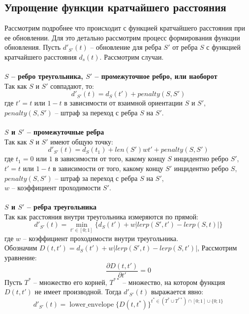 \subsection{Упрощение функции кратчайшего расстояния}
Рассмотрим подробнее что происходит с функцией кратчайшего расстояния
при ее обновлении. Для это детально рассмотрим процесс формирования
функции обновления. Пусть $d'_{S'}(t)$ -- обновление для ребра $S'$ от ребра
$S$ с функцией кратчайшего расстояния $d_s(t)$. Рассмотрим случаи.
\\
\\
\textbf{$S$ -- ребро треугольника, $S'$ -- промежуточное ребро, или наоборот}\\
Так как $S$ и $S'$ совпадают, то:
\begin{equation} \label{eq:itd}
d'_{S'}(t) = d_S(t') + penalty(S, S')
\end{equation}
где $t' = t$ или $1 - t$ в зависимости от взаимной ориентации $S$ и $S'$,\\
$penalty(S, S')$ -- штраф за переход с ребра $S$ на $S'$.
\\
\\
\textbf{$S$ и $S'$ -- промежуточные ребра}\\
Так как $S$ и $S'$ имеют общую точку:
\begin{equation} \label{eq:iid}
d'_{S'}(t) = d_S(t_1) + len(S')wt' + penalty(S, S')
\end{equation}
где $t_1 = 0$ или $1$ в зависимости от того, какому концу $S$
инцидентно ребро  $S'$,\\
$t' = t$ или $1 - t$ в зависимости от того, какому концу $S'$
инцидентно ребро $S$,\\
$penalty(S, S')$ -- штраф за переход с ребра $S$ на $S'$,\\
$w$ -- коэффициент проходимости $S'$.
\\
\\
\textbf{$S$ и $S'$ -- ребра треугольника}\\
Так как расстояния внутри треугольника измеряются по прямой:
\begin{equation} \label{eq:ttd}
d'_{S'}(t) = \min_{t' \in [0; 1]}\{d_S(t') + w|lerp(S', t') - lerp(S, t)|\}
\end{equation}
где $w$ -- коэффициент проходимости внутри треугольника.\\
Обозначим $D(t, t') = d_S(t') + w|lerp(S', t) - lerp(S, t')|$,
Рассмотрим уравнение:
\begin{equation} \label{eq:ttder}
\frac{\partial D(t, t')}{\partial t'} = 0
\end{equation}
Пусть $T^*$ -- множество его корней, $T^{**}$ -- множество, на котором
функция $D(t, t')$ не имеет производной. Тогда $d'_{S'}(t)$ выражается явно:
\begin{equation} \label{eq:ttd2}
d'_{S'}(t) = \mathop{lower\_envelope}
  \{D(t, t^*)\}^{t^* \in (T^* \cup T^{**}) \cap [0;1] \cup \{0; 1\}}
\end{equation}

